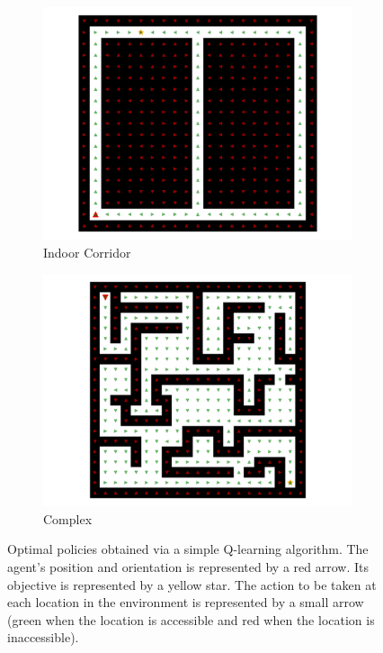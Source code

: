 \begin{figure}[H]
    \centering
    \begin{subfigure}{0.515\textwidth}
        \centering
        \includegraphics[width=\textwidth]{resources/pdf/C/indoor-corridor.pdf}
        \caption{Indoor Corridor}
    \end{subfigure}
    \hfill
    \begin{subfigure}{0.465\textwidth}
        \centering
        \includegraphics[width=\textwidth]{resources/pdf/C/complex.pdf}
        \caption{Complex}
    \end{subfigure}
    \caption{Optimal policies obtained via a simple Q-learning algorithm. The agent's position and orientation is represented by a red arrow. Its objective is represented by a yellow star. The action to be taken at each location in the environment is represented by a small arrow (green when the location is accessible and red when the location is inaccessible).}
    \label{fig:C.reinforcement.learning.policies}
\end{figure}

